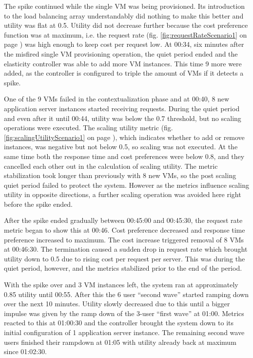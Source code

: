 \documentclass[english]{tktltiki2}
\theoremstyle{definition}
\theoremstyle{remark}
\begin{document}
The spike continued while the single VM was being provisioned. Its introduction
to the load balancing array understandably did nothing to make this better and
utility was flat at 0.5. Utility did not decrease further because the cost
preference function was at maximum, i.e. the request rate (fig.
\ref{fig:requestRateScenario1} on page \pageref{fig:requestRateScenario1}) was
high enough to keep cost per request low. At 00:34, six minutes after the
misfired single VM provisioning operation, the quiet period ended and the
elasticity controller was able to add more VM instances. This time 9 more were
added, as the controller is configured to triple the amount of VMs if it detects
a spike.

One of the 9 VMs failed in the contextualization phase and at 00:40, 8 new
application server instances started receiving requests. During the quiet period
and even after it until 00:44, utility was below the 0.7 threshold, but no
scaling operations were executed. The scaling utility metric (fig.
\ref{fig:scalingUtilityScenario1} on page
\pageref{fig:scalingUtilityScenario1}), which indicates whether to add or remove
instances, was negative but not below 0.5, so scaling was not executed. At the
same time both the response time and cost preferences were below 0.8, and they
cancelled each other out in the calculation of scaling utility. The metric
stabilization took longer than previously with 8 new VMs, so the post scaling
quiet period failed to protect the system. However as the metrics influence
scaling utility in opposite directions, a further scaling operation was avoided
here right before the spike ended.

After the spike ended gradually between 00:45:00 and 00:45:30, the request rate
metric began to show this at 00:46. Cost preference decreased and response time
preference increased to maximum. The cost increase triggered removal of 8 VMs at
00:46:30. The termination caused a sudden drop in request rate which brought
utility down to 0.5 due to rising cost per request per server. This was during
the quiet period, however, and the metrics stabilized prior to the end of the
period.

With the spike over and 3 VM instances left, the system ran at approximately
0.85 utility until 00:55. After this the 6 user ``second wave'' started ramping
down over the next 10 minutes. Utility slowly decreased due to this until a
bigger impulse was given by the ramp down of the 3-user ``first wave'' at 01:00.
Metrics reacted to this at 01:00:30 and the controller brought the system down
to its initial configuration of 1 application server instance. The remaining
second wave users finished their rampdown at 01:05 with utility already back at
maximum since 01:02:30.
\end{document}
